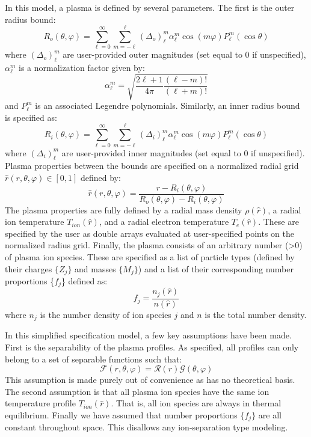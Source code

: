 	In this model, a plasma is defined by several parameters. The first is the outer radius bound:
	\begin{equation}
		R_o(\theta, \varphi) = \sum_{\ell=0}^{\infty} \sum_{m=-\ell}^{\ell} \left(\Delta_{o}\right)_\ell^{m} \alpha_{\ell}^{m} \cos(m\varphi) P_{\ell}^{m}(\cos\theta)
	\end{equation}
	where $\left(\Delta_{o}\right)_\ell^{m}$ are user-provided outer magnitudes (set equal to 0 if unspecified), $\alpha_{\ell}^{m}$ is a normalization factor given by:
	\begin{equation}
		\alpha_{\ell}^{m} = \sqrt{\frac{2\ell+1}{4\pi}\frac{(\ell - m)!}{(\ell+m)!}}
	\end{equation}
	and $P_{\ell}^{m}$ is an associated Legendre polynomials. Similarly, an inner radius bound is specified as:
	\begin{equation}
		R_i(\theta, \varphi) = \sum_{\ell=0}^{\infty} \sum_{m=-\ell}^{\ell} \left(\Delta_{i}\right)_\ell^{m} \alpha_{\ell}^{m} \cos(m\varphi) P_{\ell}^{m}(\cos\theta)
	\end{equation}
	where $\left(\Delta_{i}\right)_\ell^{m}$ are user-provided inner magnitudes (set equal to 0 if unspecified). Plasma properties between the bounds are specified on a normalized radial grid $\hat{r}(r,\theta,\varphi)\in [0,1]$ defined by:
	\begin{equation}
		\hat{r}(r,\theta,\varphi) = \frac{r-R_{i}(\theta,\varphi)}{R_{o}(\theta,\varphi)-R_{i}(\theta,\varphi)}
	\end{equation}
	The plasma properties are fully defined by a radial mass density $\rho(\hat{r})$, a radial ion temperature $T_{ion}(\hat{r})$, and a radial electron temperature $T_e(\hat{r})$. These are specified by the user as double arrays evaluated at user-specified points on the normalized radius grid. Finally, the plasma consists of an arbitrary number (>0) of plasma ion species. These are specified as a list of particle types (defined by their charges $\{Z_j\}$ and masses $\{M_j\}$) and a list of their corresponding number proportions \{$f_j$\} defined as:
	\begin{equation}
		f_j = \frac{n_j(\hat{r})}{n(\hat{r})}
	\end{equation}
	where $n_j$ is the number density of ion species $j$ and $n$ is the total number density.
	
	In this simplified specification model, a few key assumptions have been made. First is the separability of the plasma profiles. As specified, all profiles can only belong to a set of separable functions such that:
	\begin{equation}
		\mathcal{F}(r, \theta, \varphi) = \mathcal{R}(r) \mathcal{G}(\theta, \varphi)
	\end{equation}
	This assumption is made purely out of convenience as has no theoretical basis. The second assumption is that all plasma ion species have the same ion temperature profile $T_{ion}(\hat{r})$. That is, all ion species are always in thermal equilibrium. Finally we have assumed that number proportions $\{f_j\}$ are all constant throughout space. This disallows any ion-separation type modeling.
	

